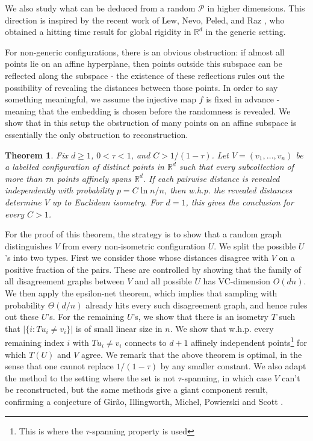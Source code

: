 \documentclass[fullpage,11pt]{article}
\newcommand{\R}{\mathbb{R}}
\theoremstyle{break}
\newtheorem{theorem}{Theorem}
\theoremstyle{definition}
\theoremstyle{break}
\begin{document}
We also study what can be deduced from a random $\mathcal{P}$ in higher dimensions. This direction is inspired by the recent work of Lew, Nevo, Peled, and Raz \cite{https://doi.org/10.48550/arxiv.2202.09917}, who obtained a hitting time result for global rigidity in $\mathbb{R}^d$ in the generic setting.

For non-generic configurations, there is an obvious obstruction: if almost all points lie on an affine hyperplane, then points outside this subspace can be reflected along the subspace - the existence of these reflections rules out the possibility of revealing the distances between those points. In order to say something meaningful, we assume the injective map $f$ is fixed in advance - meaning that the embedding is chosen before the randomness is revealed. We show that in this setup the obstruction of many points on an affine subspace is essentially the only obstruction to reconstruction.

\begin{theorem}\label{THM - Random Reconstruction}
Fix \(d\ge1\), \(0<\tau<1\), and \(C>1/(1-\tau)\). Let
\(V=(v_1,\ldots,v_n)\) be a labelled configuration of distinct points in \(\R^d\) such that every
subcollection of more than \(\tau n\) points affinely spans \(\R^d\). If each
pairwise distance is revealed independently with probability \(p=C\ln n/n\),
then w.h.p. the revealed distances determine \(V\) up to Euclidean isometry.
For \(d=1\), this gives the conclusion for every \(C>1\).
\end{theorem}

For the proof of this theorem, the strategy is to show that a random graph distinguishes \(V\) from every non-isometric configuration \(U\). We split the possible \(U\)'s into
two types. First we consider those whose distances disagree with \(V\) on a
positive fraction of the pairs. These are controlled by showing that the
family of all disagreement graphs between \(V\) and all possible \(U\) has
VC-dimension \(O(dn)\). We then apply the epsilon-net theorem, which implies that sampling with probability
\(\Theta(d/n)\) already hits every such disagreement graph, and hence rules
out these \(U\)'s. For the remaining \(U\)'s, we show that there is an isometry $T$ such that $|\{i:T u_i\ne v_i\}|$ is of small linear size in $n$. We show that w.h.p. every remaining index $i$ with $T u_i\ne v_i$ connects to $d+1$ affinely independent points\footnote{This is where the \(\tau\)-spanning property is used} for which $T(U)$ and $V$ agree. We remark that the above theorem is optimal, in the sense that one cannot replace $1/(1-\tau)$ by any smaller constant. We also adapt the method to the setting where the set is not $\tau$-spanning, in which case $V$ can't be reconstructed, but the same methods give a giant component result, confirming a conjecture of Girão, Illingworth, Michel, Powierski and Scott \cite{FUWgirao2023reconstructing}.
\end{document}
